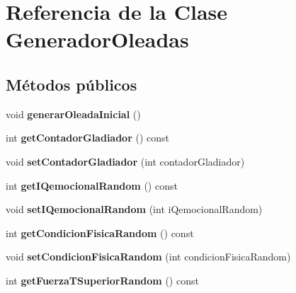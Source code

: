 \hypertarget{classGeneradorOleadas}{}\section{Referencia de la Clase Generador\+Oleadas}
\label{classGeneradorOleadas}
\subsection*{Métodos públicos}
\begin{DoxyCompactItemize}
\item 
\mbox{\label{classGeneradorOleadas_acdc4866d7e5a9b9eee08b934aa84e097}} 
void {\bfseries generar\+Oleada\+Inicial} ()
\item 
\mbox{\label{classGeneradorOleadas_ab510a63b7c40271c3a11940977fba85e}} 
int {\bfseries get\+Contador\+Gladiador} () const
\item 
\mbox{\label{classGeneradorOleadas_ad0c3dc7d566cd3d9be6295de922f7dce}} 
void {\bfseries set\+Contador\+Gladiador} (int contador\+Gladiador)
\item 
\mbox{\label{classGeneradorOleadas_ad6368fe4743dbd692b5f20c854513ea3}} 
int {\bfseries get\+I\+Qemocional\+Random} () const
\item 
\mbox{\label{classGeneradorOleadas_a0f5d167519bd5e181717eef0d5e6029d}} 
void {\bfseries set\+I\+Qemocional\+Random} (int i\+Qemocional\+Random)
\item 
\mbox{\label{classGeneradorOleadas_acd401ef9d085c3f44d4abed3c5fb0344}} 
int {\bfseries get\+Condicion\+Fisica\+Random} () const
\item 
\mbox{\label{classGeneradorOleadas_af30a6f20cf9ea3ac060bc04d62c41b86}} 
void {\bfseries set\+Condicion\+Fisica\+Random} (int condicion\+Fisica\+Random)
\item 
\mbox{\label{classGeneradorOleadas_af4d62ac9d1602d2bf8d30faa258092a3}} 
int {\bfseries get\+Fuerza\+T\+Superior\+Random} () const
\item 

\end{DoxyCompactItemize}
